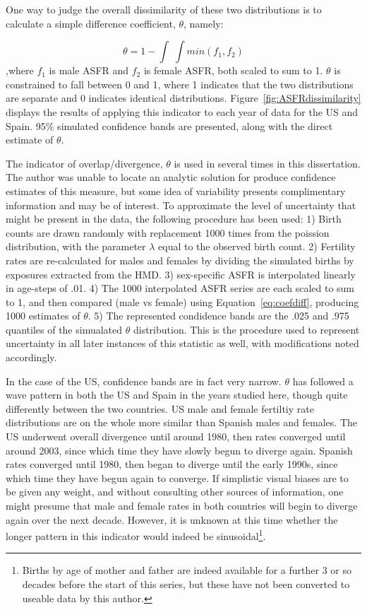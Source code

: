 One way to judge the overall dissimilarity of these two distributions is to
calculate a simple difference coefficient, $\theta$, namely:

\begin{equation}
\label{eq:coefdiff}
\theta = 1 - \int \;\int min(f_1, f_2)
\end{equation}
,where $f_1$ is male ASFR and $f_2$ is female ASFR, both scaled to sum
to 1. $\theta$ is constrained to fall between 0 and 1, where 1 indicates that the
two distributions are separate and 0 indicates identical distributions.
Figure~\ref{fig:ASFRdissimilarity} displays the results of applying this
indicator to each year of data for the US and Spain. 95\% simulated confidence
bands are presented, along with the direct estimate of
$\theta$. 

The indicator of overlap/divergence, $\theta$ is
used in several times in this dissertation. The author was unable to locate
an analytic solution for produce confidence estimates of this measure, but
some idea of variability presents complimentary information and may be of
interest. To approximate the level of uncertainty that might be present in the
data, the following procedure has been used: 1) Birth counts are drawn randomly
with replacement 1000 times from the poission distribution, with the parameter
$\lambda$ equal to the observed birth count. 2) Fertility rates are
re-calculated for males and females by dividing the simulated births by
exposures extracted from the HMD. 3) sex-specific ASFR is interpolated linearly
in age-steps of .01. 4) The 1000 interpolated ASFR series are each scaled to sum
to 1, and then compared (male vs female) using Equation~\ref{eq:coefdiff}, producing 1000 estimates of
$\theta$. 5) The represented condidence bands are the .025 and .975 quantiles
of the simualated $\theta$ distribution. This is the procedure used to represent
uncertainty in all later instances of this statistic as well, with
modifications noted accordingly. 

In the case of the US, confidence bands are in fact very narrow. $\theta$ has followed
a wave pattern in both the US and Spain in the years studied here, though 
quite differently between the two countries. US male and female fertiltiy rate
distributions are on the whole more similar than Spanish males and females. The
US underwent overall divergence until around 1980, then rates converged until
around 2003, since which time they have slowly begun to diverge again. Spanish
rates converged until 1980, then began to diverge until the early 1990s, since
which time they have begun again to converge. If simplistic visual biases are to
be given any weight, and without consulting other sources of information, one
might presume that male and female rates in both countries will begin to diverge
again over the next decade. However, it is unknown at this time whether the
longer pattern in this indicator would indeed be sinusoidal\footnote{Births by
age of mother and father are indeed available for a further 3 or so decades
before the start of this series, but these have not been converted to
useable data by this author.}.

